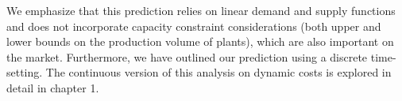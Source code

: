 We emphasize that this prediction relies on linear demand and supply functions and does not incorporate capacity constraint considerations (both upper and lower bounds on the production volume of plants), which are also important on the market.  Furthermore, we have outlined our prediction using a discrete time-setting. 
The continuous version of this analysis on dynamic costs is explored in detail in chapter 1.\\ 
%
%
%

